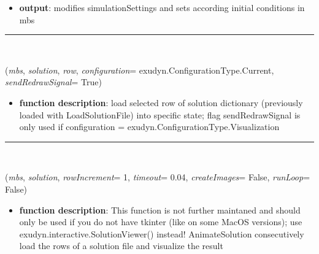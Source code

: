 \begin{itemize}[leftmargin=1.4cm]
\begin{itemize}[leftmargin=1.4cm]
\begin{itemize}[leftmargin=1.4cm]
\begin{itemize}[leftmargin=0.5cm]
\begin{itemize}[leftmargin=0.7cm]
\begin{itemize}[leftmargin=1.2cm]
\item[]{\it restartFileName}: string containing directory and filename of stored restart file, as given in solutionSettings.restartFileName
\item[]{\it verbose}: False=no information, True=basic information
\end{itemize}
\item[--]
{\bf output}: modifies simulationSettings and sets according initial conditions in mbs
\vspace{12pt}\end{itemize}
%
\noindent\rule{8cm}{0.75pt}\vspace{1pt} \\ 
\begin{flushleft}
\label{sec:basicUtilities:SetSolutionState}
({\it mbs}, {\it solution}, {\it row}, {\it configuration}= exudyn.ConfigurationType.Current, {\it sendRedrawSignal}= True)
\end{flushleft}
\setlength{\itemindent}{0.7cm}
\begin{itemize}[leftmargin=0.7cm]
\item[--]
{\bf function description}: load selected row of solution dictionary (previously loaded with LoadSolutionFile) into specific state; flag sendRedrawSignal is only used if configuration = exudyn.ConfigurationType.Visualization
\vspace{12pt}\end{itemize}
%
\noindent\rule{8cm}{0.75pt}\vspace{1pt} \\ 
\begin{flushleft}
\label{sec:basicUtilities:AnimateSolution}
({\it mbs}, {\it solution}, {\it rowIncrement}= 1, {\it timeout}= 0.04, {\it createImages}= False, {\it runLoop}= False)
\end{flushleft}
\setlength{\itemindent}{0.7cm}
\begin{itemize}[leftmargin=0.7cm]
\item[--]
{\bf function description}: This function is not further maintaned and should only be used if you do not have tkinter (like on some MacOS versions); use exudyn.interactive.SolutionViewer() instead! AnimateSolution consecutively load the rows of a solution file and visualize the result

\end{itemize}
\end{itemize}
\end{itemize}
\end{itemize}
\end{itemize}
